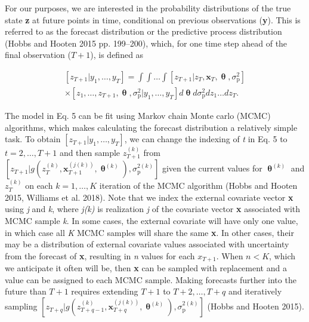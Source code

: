 \documentclass[12pt,]{article}
\begin{document}
For our purposes, we are interested in the probability distributions of
the true state \textbf{z} at future points in time, conditional on
previous observations (\textbf{y}). This is referred to as the forecast
distribution or the predictive process distribution (Hobbs and Hooten
2015 pp. 199--200), which, for one time step ahead of the final
observation (\(T+1\)), is defined as

\begin{equation}
\begin{gathered}
\left[z_{T+1} | y_1,\dots,y_T \right] = \int \int \dots \int \left[z_{T+1} | z_T, \textbf{x}_T, \bm{\uptheta}, \sigma^2_{\text{p}} \right] \\ \times \left[z_1,\dots,z_{T+1},\bm{\uptheta}, \sigma^2_{\text{p}} | y_1,\dots,y_T \right] d\bm{\uptheta} d\sigma^2_{\text{p}} dz_1 \dots dz_T.
\end{gathered}
\end{equation}

The model in Eq. 5 can be fit using Markov chain Monte carlo (MCMC)
algorithms, which makes calculating the forecast distribution a
relatively simple task. To obtain
\(\left[z_{T+1} | y_1,\dots,y_T \right]\), we can change the indexing of
\emph{t} in Eq. 5 to \(t = 2,\dots,T+1\) and then sample
\(z_{T+1}^{(k)}\) from
\(\left[z_{T+1} | g(z_T^{(k)}, \textbf{x}_{T+1}^{(j(k))}, \bm{\uptheta}^{(k)}), \sigma^{2(k)}_{\text{p}} \right]\)
given the current values for \(\bm{\uptheta}^{(k)}\) and \(z_{T}^{(k)}\)
on each \(k = 1,\dots,K\) iteration of the MCMC algorithm (Hobbs and
Hooten 2015, Williams et al. 2018). Note that we index the external
covariate vector \textbf{x} using \emph{j} and \emph{k}, where
\emph{j(k)} is realization \emph{j} of the covariate vector \textbf{x}
associated with MCMC sample \emph{k}. In some cases, the external
covariate will have only one value, in which case all \emph{K} MCMC
samples will share the same \textbf{x}. In other cases, their may be a
distribution of external covariate values associated with uncertainty
from the forecast of \textbf{x}, resulting in \emph{n} values for each
\(x_{T+1}\). When \(n < K\), which we anticipate it often will be, then
\textbf{x} can be sampled with replacement and a value can be assigned
to each MCMC sample. Making forecasts further into the future than
\(T+1\) requires extending \(T+1\) to \(T+2,\dots,T+q\) and iteratively
sampling
\(\left[z_{T+q} | g(z_{T+q-1}^{(k)}, \textbf{x}_{T+q}^{(j(k))},\bm{\uptheta}^{(k)}), \sigma^{2(k)}_{\text{p}} \right]\)
(Hobbs and Hooten 2015).
\end{document}

